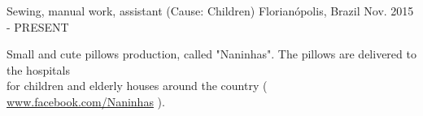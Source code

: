 

\begin{cventries}

  \cventry
    {Sewing, manual work, assistant (Cause: Children)} %
    {} %
    {Florianópolis, Brazil} %
    {Nov. 2015 - PRESENT} %
    {
      \begin{cvitems} %
        \item {Small and cute pillows production, called "Naninhas". The pillows are delivered to the hospitals \\
	for children and elderly houses around the country ( \href{https://www.facebook.com/Naninhas}{www.facebook.com/Naninhas} ).}
      \end{cvitems}
    }

\end{cventries}
